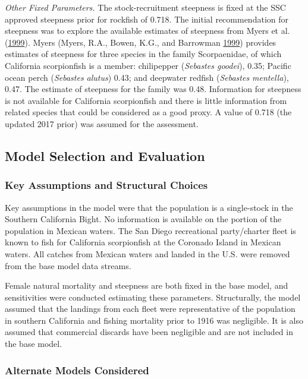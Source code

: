 \documentclass[12pt,]{article}
\begin{document}
\emph{Other Fixed Parameters.} The stock-recruitment steepness is fixed
at the SSC approved steepness prior for rockfish of 0.718. The initial
recommendation for steepness was to explore the available estimates of
steepness from Myers et al. (\protect\hyperlink{ref-Myers1999}{1999}).
Myers (Myers, R.A., Bowen, K.G., and Barrowman
\protect\hyperlink{ref-Myers1999}{1999}) provides estimates of steepness
for three species in the family Scorpaenidae, of which California
scorpionfish is a member: chilipepper (\emph{Sebastes goodei}), 0.35;
Pacific ocean perch (\emph{Sebastes alutus}) 0.43; and deepwater redfish
(\emph{Sebastes mentella}), 0.47. The estimate of steepness for the
family was 0.48. Information for steepness is not available for
California scorpionfish and there is little information from related
species that could be considered as a good proxy. A value of 0.718 (the
updated 2017 prior) was assumed for the assessment.

\subsection{Model Selection and
Evaluation}\label{model-selection-and-evaluation}

\subsubsection{Key Assumptions and Structural
Choices}\label{key-assumptions-and-structural-choices}

Key assumptions in the model were that the population is a single-stock
in the Southern California Bight. No information is available on the
portion of the population in Mexican waters. The San Diego recreational
party/charter fleet is known to fish for California scorpionfish at the
Coronado Island in Mexican waters. All catches from Mexican waters and
landed in the U.S. were removed from the base model data streams.

Female natural mortality and steepness are both fixed in the base model,
and sensitivities were conducted estimating these parameters.
Structurally, the model assumed that the landings from each fleet were
representative of the population in southern California and fishing
mortality prior to 1916 was negligible. It is also assumed that
commercial discards have been negligible and are not included in the
base model.

\subsubsection{Alternate Models
Considered}\label{alternate-models-considered}
\end{document}
